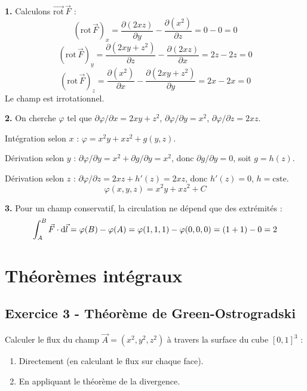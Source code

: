 \documentclass[12pt,a4paper]{article}
\begin{document}
\begin{boitecorrige}
\textbf{1.} Calculons $\overrightarrow{\text{rot}}\,\vec{F}$ :
\[
(\text{rot}\,\vec{F})_x = \frac{\partial(2xz)}{\partial y}-\frac{\partial(x^2)}{\partial z} = 0-0=0
\]
\[
(\text{rot}\,\vec{F})_y = \frac{\partial(2xy+z^2)}{\partial z}-\frac{\partial(2xz)}{\partial x} = 2z-2z=0
\]
\[
(\text{rot}\,\vec{F})_z = \frac{\partial(x^2)}{\partial x}-\frac{\partial(2xy+z^2)}{\partial y} = 2x-2x=0
\]
Le champ est irrotationnel.

\textbf{2.} On cherche $\varphi$ tel que $\partial\varphi/\partial x = 2xy+z^2$, $\partial\varphi/\partial y=x^2$, $\partial\varphi/\partial z=2xz$.

Intégration selon $x$ : $\varphi = x^2y + xz^2 + g(y,z)$.

Dérivation selon $y$ : $\partial\varphi/\partial y = x^2 + \partial g/\partial y = x^2$, donc $\partial g/\partial y=0$, soit $g=h(z)$.

Dérivation selon $z$ : $\partial\varphi/\partial z = 2xz + h'(z) = 2xz$, donc $h'(z)=0$, $h=\text{cste}$.
\[
\boxed{\varphi(x,y,z) = x^2y + xz^2 + C}
\]

\textbf{3.} Pour un champ conservatif, la circulation ne dépend que des extrémités :
\[
\int_A^B \vec{F}\cdot\mathrm{d}\vec{l} = \varphi(B)-\varphi(A) = \varphi(1,1,1)-\varphi(0,0,0) = (1+1)-0 = 2
\]
\end{boitecorrige}

\section{Théorèmes intégraux}

\subsection*{Exercice 3 - Théorème de Green-Ostrogradski \niveau{\moyen}}

\begin{boiteexercice}
Calculer le flux du champ $\vec{A} = (x^2, y^2, z^2)$ à travers la surface du cube $[0,1]^3$ :
\begin{enumerate}
  \item Directement (en calculant le flux sur chaque face).
  \item En appliquant le théorème de la divergence.
\end{enumerate}
\end{boiteexercice}
\end{document}
